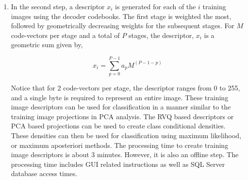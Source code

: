 \documentclass[12pt,letterpaper,doublespaced,ETD]{gt-ece-thesis} %
\begin{document}
\begin{Body}
\begin{enumerate}
\item In the second step, a descriptor $x_i$ is generated for each of the $i$ training images using the decoder codebooks.  The first stage is weighted the most, followed by geometrically decreasing weights for the subsequent stages.  For $M$ code-vectors per stage and a total of $P$ stages, the descriptor, $x_i$ is a geometric sum given by,

\begin{equation}
x_i=\sum_{p=0}^{P-1}a_pM^{(P-1-p)}
\end{equation}

Notice that for 2 code-vectors per stage, the descriptor ranges from 0 to 255, and a single byte is required to represent an entire image.  These training image descriptors can be used for classification in a manner similar to the training image projections in PCA analysis.  The RVQ based descriptors or PCA based projections can be used to create class conditional densities.  These densities can then be used for classification using maximum likelihood, or maximum aposteriori methods.  The processing time to create training image descriptors is about 3 minutes.  However, it is also an offline step.  The processing time includes GUI related instructions as well as SQL Server database access times.


\end{enumerate}
\end{Body}
\end{document}
